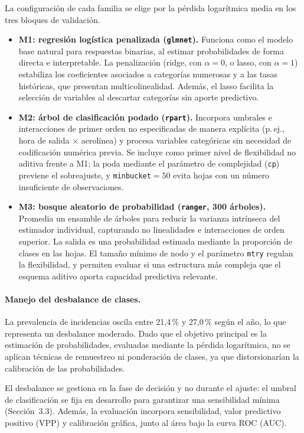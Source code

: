 \documentclass[11pt,a4paper]{article}
\begin{document}
La configuración de cada familia se elige por la pérdida logarítmica media en los tres bloques de validación.
 
\begin{itemize}
  \item \textbf{M1: regresión logística penalizada (\texttt{glmnet}).} Funciona como el modelo base natural para respuestas binarias, al estimar probabilidades de forma directa e interpretable. La penalización (ridge, con $\alpha=0$, o lasso, con $\alpha=1$) estabiliza los coeficientes asociados a categorías numerosas y a las tasas históricas, que presentan multicolinealidad. Además, el lasso facilita la selección de variables al descartar categorías sin aporte predictivo.
  \item \textbf{M2: árbol de clasificación podado (\texttt{rpart}).} Incorpora umbrales e interacciones de primer orden no especificadas de manera explícita (p.\,ej., hora de salida $\times$ aerolínea) y procesa variables categóricas sin necesidad de codificación numérica previa. Se incluye como primer nivel de flexibilidad no aditiva frente a M1; la poda mediante el parámetro de complejidad (\texttt{cp}) previene el sobreajuste, y \texttt{minbucket}$=50$ evita hojas con un número insuficiente de observaciones.
  \item \textbf{M3: bosque aleatorio de probabilidad (\texttt{ranger}, 300 árboles).} Promedia un ensamble de árboles para reducir la varianza intrínseca del estimador individual, capturando no linealidades e interacciones de orden superior. La salida es una probabilidad estimada mediante la proporción de clases en las hojas. El tamaño mínimo de nodo y el parámetro \texttt{mtry} regulan la flexibilidad, y permiten evaluar si una estructura más compleja que el esquema aditivo aporta capacidad predictiva relevante.
\end{itemize}
 
\paragraph{Manejo del desbalance de clases.}
La prevalencia de incidencias oscila entre 21,4\,\% y 27,0\,\% según el año, lo que representa un desbalance moderado. Dado que el objetivo principal es la estimación de probabilidades, evaluadas mediante la pérdida logarítmica, no se aplican técnicas de remuestreo ni ponderación de clases, ya que distorsionarían la calibración de las probabilidades.
 
El desbalance se gestiona en la fase de decisión y no durante el ajuste: el umbral de clasificación se fija en desarrollo para garantizar una sensibilidad mínima (Sección~3.3). Además, la evaluación incorpora sensibilidad, valor predictivo positivo (VPP) y calibración gráfica, junto al área bajo la curva ROC (AUC).
 
\end{document}
